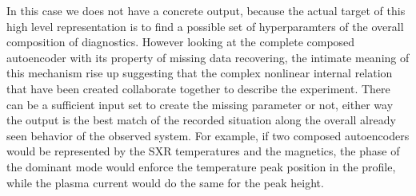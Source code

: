 In this case we does not have a concrete output, because the actual target of this high level representation is to find a possible set of hyperparamters of the overall composition of diagnostics. However looking at the complete composed autoencoder with its property of missing data recovering, the intimate meaning of this mechanism rise up suggesting that the complex nonlinear internal relation that have been created collaborate together to describe the experiment. There can be a sufficient input set to create the missing parameter or not, either way the output is the best match of the recorded situation along the overall already seen behavior of the observed system.
For example, if two composed autoencoders would be represented by the SXR temperatures and the magnetics, the phase of the dominant mode would enforce the temperature peak position in the profile, while the plasma current would do the same for the peak height.
